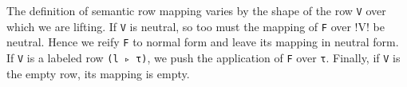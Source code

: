 \documentclass[authoryear, acmsmall, screen, review, nonacm]{acmart}
\begin{document}
\Ni The definition of semantic row mapping varies by the shape of the row \verb!V! over which we are lifting. If \verb!V! is neutral, so too must the mapping of \verb!F! over !V! be neutral. Hence we reify \verb!F! to normal form and leave its mapping in neutral form. If \verb!V! is a labeled row \verb!(l ▹ τ)!, we push the application of \verb!F! over \verb!τ!. Finally, if \verb!V! is the empty row, its mapping is empty.

\begin{code}%
\>[0]\AgdaSpace{}%
\AgdaSymbol{:}\AgdaSpace{}%
\AgdaSpace{}%
\AgdaSpace{}%
\AgdaSymbol{(}\AgdaSpace{}%
\AgdaSpace{}%
\AgdaSymbol{)}\AgdaSpace{}%
\AgdaSpace{}%
\AgdaSpace{}%
\AgdaSpace{}%
\AgdaOperator{\AgdaInductiveConstructor{R[}}\AgdaSpace{}%
\AgdaSpace{}%
\AgdaOperator{\AgdaInductiveConstructor{]}}\AgdaSpace{}%
\AgdaSpace{}%
\AgdaSpace{}%
\AgdaSpace{}%
\AgdaOperator{\AgdaInductiveConstructor{R[}}\AgdaSpace{}%
\AgdaSpace{}%
\AgdaOperator{\AgdaInductiveConstructor{]}}\<%
\\
\>[0]\AgdaSpace{}%
\AgdaSymbol{\{}\AgdaSpace{}%
\AgdaSymbol{=}\AgdaSpace{}%
\AgdaSymbol{\}}\AgdaSpace{}%
\AgdaSymbol{\{}\AgdaSymbol{\}}\AgdaSpace{}%
\AgdaSpace{}%
\AgdaSymbol{(}\AgdaSpace{}%
\AgdaSymbol{(}\AgdaSpace{}%
\AgdaSymbol{))}\AgdaSpace{}%
\AgdaSymbol{=}\AgdaSpace{}%
\AgdaSpace{}%
\AgdaSymbol{(}\AgdaSpace{}%
\AgdaSpace{}%
\AgdaOperator{\AgdaInductiveConstructor{<\$>}}\AgdaSpace{}%
\AgdaSymbol{)}\<%
\\
\>[0]\AgdaSpace{}%
\AgdaSymbol{\{}\AgdaSpace{}%
\AgdaSymbol{=}\AgdaSpace{}%
\AgdaSymbol{\}}\AgdaSpace{}%
\AgdaSymbol{\{}\AgdaSymbol{\}}\AgdaSpace{}%
\AgdaSpace{}%
\AgdaSymbol{(}\AgdaSpace{}%
\AgdaSymbol{(}\AgdaSpace{}%
\AgdaSymbol{(}\AgdaSpace{}%
\AgdaOperator{\AgdaInductiveConstructor{,}}\AgdaSpace{}%

\end{code}
\end{document}
